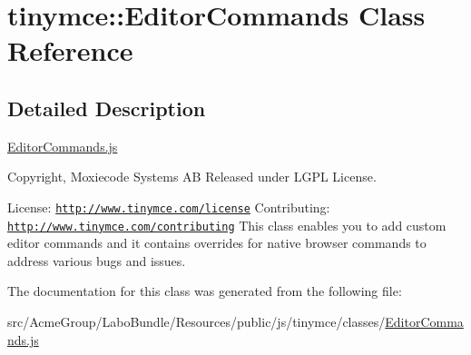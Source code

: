 \hypertarget{classtinymce_1_1_editor_commands}{\section{tinymce\+:\+:Editor\+Commands Class Reference}
\label{classtinymce_1_1_editor_commands}
}


\subsection{Detailed Description}
\hyperlink{_editor_commands_8js}{Editor\+Commands.\+js}

Copyright, Moxiecode Systems A\+B Released under L\+G\+P\+L License.

License\+: \href{http://www.tinymce.com/license}{\tt http\+://www.\+tinymce.\+com/license} Contributing\+: \href{http://www.tinymce.com/contributing}{\tt http\+://www.\+tinymce.\+com/contributing} This class enables you to add custom editor commands and it contains overrides for native browser commands to address various bugs and issues. 

The documentation for this class was generated from the following file\+:\begin{DoxyCompactItemize}
\item 
src/\+Acme\+Group/\+Labo\+Bundle/\+Resources/public/js/tinymce/classes/\hyperlink{_editor_commands_8js}{Editor\+Commands.\+js}\end{DoxyCompactItemize}
